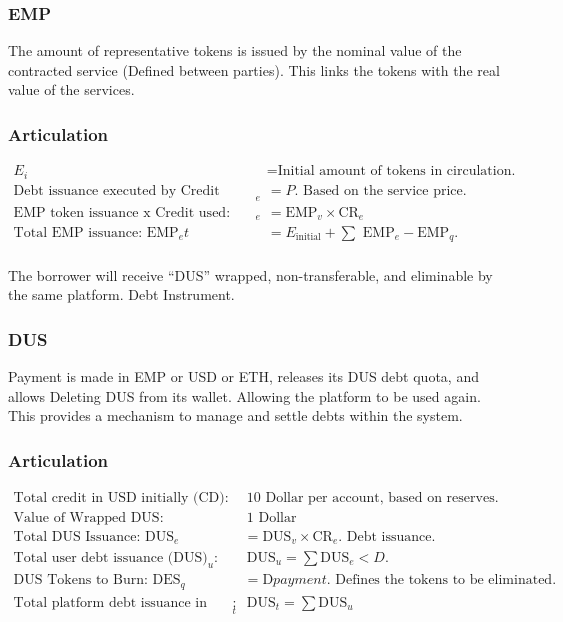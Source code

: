 \documentclass{article}
\begin{document}
\subsubsection*{EMP}
The amount of representative tokens is issued by the nominal value of the contracted service (Defined between parties). This links the tokens with the real value of the services.

\subsubsection*{Articulation}
\begin{align*}
    E_i & = \text{Initial amount of tokens in circulation.} \\
    \text{Debt issuance executed by Credit Used: CR}_e & = P. \text{ Based on the service price.} \\
    \text{EMP token issuance x Credit used: EMP}_e & = \text{EMP}_v \times \text{CR}_e\\
    \text{Total EMP issuance: EMP}_et & = E_{\text{initial}} + \sum \text{ EMP}_e - \text{EMP}_q. \\
\end{align*}

The borrower will receive “DUS” wrapped, non-transferable, and eliminable by the same platform. Debt Instrument.

\subsubsection*{DUS}

Payment is made in EMP or USD or ETH, releases its DUS debt quota, and allows Deleting DUS from its wallet. Allowing the platform to be used again. This provides a mechanism to manage and settle debts within the system.

\subsubsection*{Articulation}
\begin{align*}
    \text{Total credit in USD initially (CD):} &\ 10 \text{ Dollar per account, based on reserves.} \\
    \text{Value of Wrapped DUS:} &\ 1 \text{ Dollar} \\
    \text{Total DUS Issuance: DUS}_e & = \text{DUS}_v \times \text{CR}_e. \text{ Debt issuance.} \\
    \text{Total user debt issuance (DUS)}_u: &\ \text{DUS}_u = \sum \text{DUS}_e < D. \\
    \text{DUS Tokens to Burn: DES}_q & = \text{D}payment. \text{ Defines the tokens to be eliminated.} \\
    \text{Total platform debt issuance in dollars (DUS)}_t: &\ \text{DUS}_t = \sum \text{DUS}_u
\end{align*}
\end{document}

